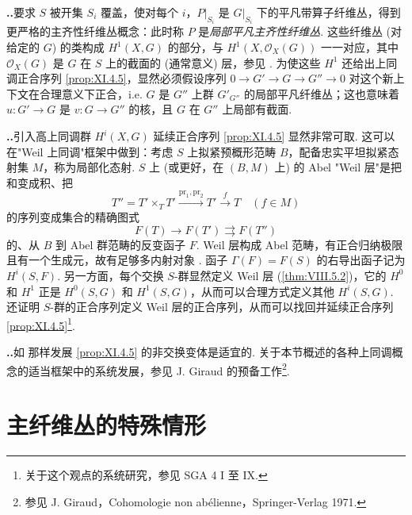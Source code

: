 \noindent\textbf{\thesection..}\quad 要求 $S$ 被开集 $S_i$ 覆盖，使对每个 $i$，$P|_{S_i}$ 是 $G|_{S_i}$ 下的平凡带算子纤维丛，得到更严格的主齐性纤维丛概念：此时称 $P$ 是\emph{局部平凡主齐性纤维丛}. 这些纤维丛 (对给定的 $G$) 的类构成 $H^1(X, G)$ 的部分，与 $H^1(X, \mathcal{O}_X(G))$ 一一对应，其中 $\mathcal{O}_X(G)$ 是 $G$ 在 $S$ 上的截面的 (通常意义) 层，参见 \cite{exp11-2}. 为使这些 $H^1$ 还给出上同调正合序列 \ref{prop:XI.4.5}，显然必须假设序列 $0 \to G' \to G \to G'' \to 0$ 对这个新上下文在合理意义下正合，i.e. $G$ 是 $G''$ 上群 $G'_{G''}$ 的局部平凡纤维丛；这也意味着 $u \colon G' \to G$ 是 $v \colon G \to G''$ 的核，且 $G$ 在 $G''$ 上局部有截面.

\noindent\textbf{\thesection..}\quad 引入高上同调群 $H^i(X, G)$ 延续正合序列 \ref{prop:XI.4.5} 显然非常可取. 这可以在"Weil 上同调"框架中做到：考虑 $S$ 上拟紧预概形范畴 $B$，配备忠实平坦拟紧态射集 $M$，称为局部化态射. $S$ 上 (或更好，在 $(B, M)$ 上) 的 Abel "Weil 层"是把和变成积、把
\[
T'' = T' \times_T T' \xrightarrow{\mathrm{pr}_1, \mathrm{pr}_2} T' \xrightarrow{f} T \quad (f \in M)
\]
的序列变成集合的精确图式
\[
F(T) \longrightarrow F(T') \rightrightarrows F(T'')
\]
的、从 $B$ 到 Abel 群范畴的反变函子 $F$. Weil 层构成 Abel 范畴，有正合归纳极限且有一个生成元，故有足够多内射对象 \cite{exp11-1}. 函子 $\Gamma(F) = F(S)$ 的右导出函子记为 $H^i(S, F)$. 另一方面，每个交换 $S$-群显然定义 Weil 层 (\cref{thm:VIII.5.2})，它的 $H^0$ 和 $H^1$ 正是 $H^0(S, G)$ 和 $H^1(S, G)$，从而可以合理方式定义其他 $H^i(S, G)$. 还证明 $S$-群的正合序列定义 Weil 层的正合序列，从而可以找回并延续正合序列 \ref{prop:XI.4.5}\footnote{关于这个观点的系统研究，参见 SGA 4 I 至 IX.}.

\noindent\textbf{\thesection..}\quad 如 \cite{exp11-2} 那样发展 \ref{prop:XI.4.5} 的非交换变体是适宜的. 关于本节概述的各种上同调概念的适当框架中的系统发展，参见 J. Giraud 的预备工作\footnote{参见 J. Giraud，Cohomologie non ab\'elienne，Springer-Verlag 1971.}.

\section{主纤维丛的特殊情形}

